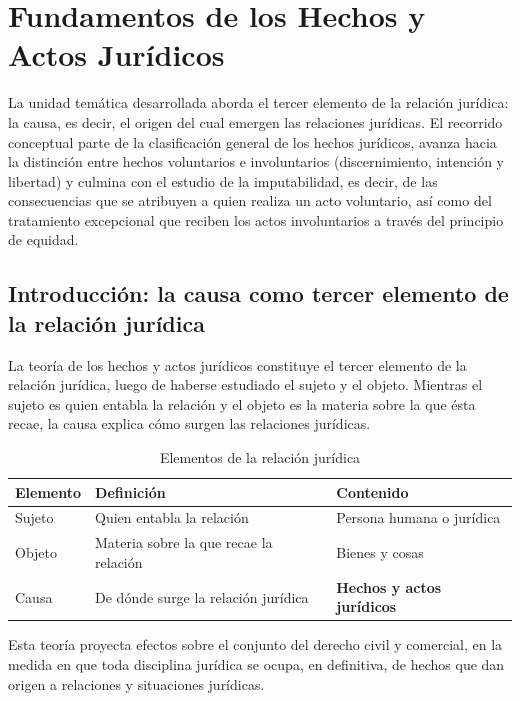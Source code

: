 \documentclass[12pt,oneside]{book}
\begin{document}
\chapter{Fundamentos de los Hechos y Actos Jurídicos}

\begin{note}
La unidad temática desarrollada aborda el tercer elemento de la relación jurídica: la causa, es decir, el origen del cual emergen las relaciones jurídicas. El recorrido conceptual parte de la clasificación general de los hechos jurídicos, avanza hacia la distinción entre hechos voluntarios e involuntarios (discernimiento, intención y libertad) y culmina con el estudio de la imputabilidad, es decir, de las consecuencias que se atribuyen a quien realiza un acto voluntario, así como del tratamiento excepcional que reciben los actos involuntarios a través del principio de equidad.
\end{note}

\section{Introducción: la causa como tercer elemento de la relación jurídica}

La teoría de los hechos y actos jurídicos constituye el tercer elemento de la relación jurídica, luego de haberse estudiado el sujeto y el objeto. Mientras el sujeto es quien entabla la relación y el objeto es la materia sobre la que ésta recae, la causa explica cómo surgen las relaciones jurídicas.

\begin{table}[H]
\centering
\caption{Elementos de la relación jurídica}
\begin{tabularx}{\textwidth}{l l X}
\toprule
\textbf{Elemento} & \textbf{Definición} & \textbf{Contenido} \\
\midrule
Sujeto & Quien entabla la relación & Persona humana o jurídica \\
Objeto & Materia sobre la que recae la relación & Bienes y cosas \\
Causa & De dónde surge la relación jurídica & \textbf{Hechos y actos jurídicos} \\
\bottomrule
\end{tabularx}
\end{table}

Esta teoría proyecta efectos sobre el conjunto del derecho civil y comercial, en la medida en que toda disciplina jurídica se ocupa, en definitiva, de hechos que dan origen a relaciones y situaciones jurídicas.
\end{document}
